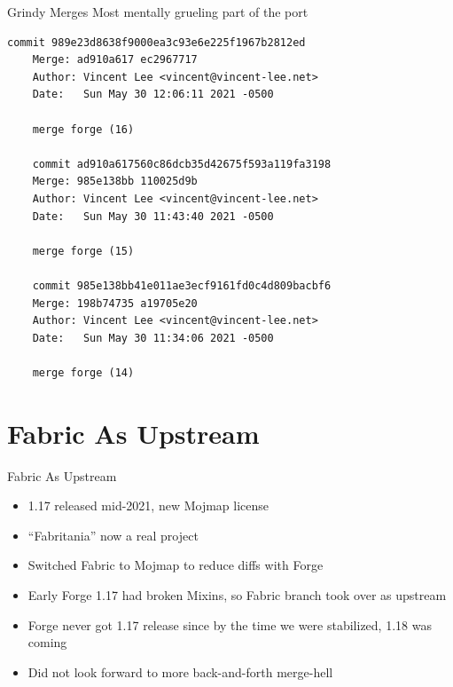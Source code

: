 \documentclass{beamer}
\begin{document}
\begin{frame}[fragile]{Grindy Merges}
  Most mentally grueling part of the port
  
  \begin{lstlisting}[basicstyle=\tiny\ttfamily]
    commit 989e23d8638f9000ea3c93e6e225f1967b2812ed
    Merge: ad910a617 ec2967717
    Author: Vincent Lee <vincent@vincent-lee.net>
    Date:   Sun May 30 12:06:11 2021 -0500

    merge forge (16)

    commit ad910a617560c86dcb35d42675f593a119fa3198
    Merge: 985e138bb 110025d9b
    Author: Vincent Lee <vincent@vincent-lee.net>
    Date:   Sun May 30 11:43:40 2021 -0500

    merge forge (15)

    commit 985e138bb41e011ae3ecf9161fd0c4d809bacbf6
    Merge: 198b74735 a19705e20
    Author: Vincent Lee <vincent@vincent-lee.net>
    Date:   Sun May 30 11:34:06 2021 -0500

    merge forge (14)
  \end{lstlisting}
\end{frame}

\section{Fabric As Upstream}
\begin{frame}{Fabric As Upstream}
  \begin{itemize}
  \item 1.17 released mid-2021, new Mojmap license
  \item ``Fabritania'' now a real project
  \item Switched Fabric to Mojmap to reduce diffs with Forge
  \item Early Forge 1.17 had broken Mixins, so Fabric branch took over as upstream
  \item Forge never got 1.17 release since by the time we were stabilized, 1.18 was coming
  \item Did not look forward to more back-and-forth merge-hell
  \end{itemize}
\end{frame}
\end{document}
